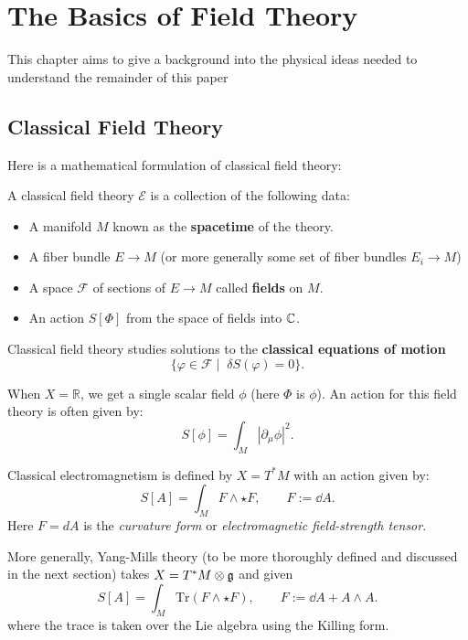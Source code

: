 \chapter{The Basics of Field Theory\label{ch:phys}}

	This chapter aims to give a background into the physical ideas needed to understand the remainder of this paper
	
	\section{Classical Field Theory} %
	\label{sec:classical_field_theory}
	
	
	
	Here is a mathematical formulation of classical field theory:
	\begin{phys}
		A classical field theory $\mathcal E$ is a collection of the following data:
		\begin{itemize}
			\item A manifold $M$ known as the \textbf{spacetime} of the theory.
			\item A fiber bundle $E \to M$ (or more generally some set of fiber bundles $E_i \to M$)
			\item A space $\mathcal F$ of sections of $E \to M$ called \textbf{fields} on $M$.
			\item An action $S[\Phi]$ from the space of fields into $\mathbb{C}$.
		\end{itemize}
		Classical field theory studies solutions to the \textbf{classical equations of motion}
		$$\{\varphi \in \mathcal F \mid \; \delta S(\varphi) = 0 \}.$$
	\end{phys}
	\begin{eg}
		When $X = \mathbb R$, we get a single scalar field $\phi$ (here $\Phi$ is $\phi$). An action for this field theory is often given by:
		$$S[\phi] = \int_M |\partial_\mu \phi|^2.$$
	\end{eg}
	\begin{eg}
		Classical electromagnetism is defined by $X=T^* M$ with an action given by:
		$$S[A] = \int_M F \wedge \star F, \qquad F := \dd A.$$
		Here $F = dA$ is the \emph{curvature form} or \emph{electromagnetic field-strength tensor}.
		
		More generally, Yang-Mills theory (to be more thoroughly defined and discussed in the next section) takes $X=T^* M \otimes \frak g$ and given 
		$$S[A] = \int_M \mathrm{Tr}\left( F \wedge \star F \right), \qquad F := \dd A + A \wedge A.$$
		where the trace is taken over the Lie algebra using the Killing form. 
	\end{eg}
	
